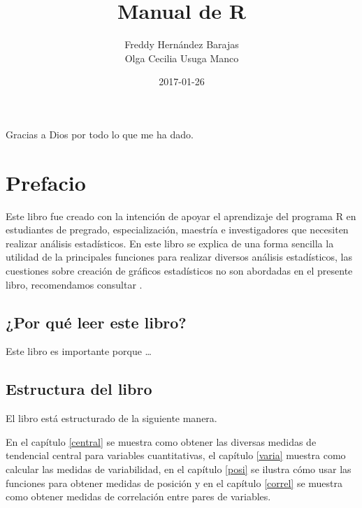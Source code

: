 \documentclass[10pt,]{krantz}
\title{Manual de R}
\author{Freddy Hernández Barajas\\
Olga Cecilia Usuga Manco}
\date{2017-01-26}
\let\proglang=\textsf
\begin{document}
\maketitle


\thispagestyle{empty}

\begin{center}

Gracias a Dios por todo lo que me ha dado.

\end{center}

\setlength{\abovedisplayskip}{-5pt}
\setlength{\abovedisplayshortskip}{-5pt}

{
\hypersetup{linkcolor=black}
\setcounter{tocdepth}{2}
\tableofcontents
}
\listoftables
\listoffigures
\chapter*{Prefacio}\label{prefacio}


Este libro fue creado con la intención de apoyar el aprendizaje del
programa \proglang{R} en estudiantes de pregrado, especialización,
maestría e investigadores que necesiten realizar análisis estadísticos.
En este libro se explica de una forma sencilla la utilidad de la
principales funciones para realizar diversos análisis estadísticos, las
cuestiones sobre creación de gráficos estadísticos no son abordadas en
el presente libro, recomendamos consultar \citet{correa_hernandez}.

\section*{¿Por qué leer este libro?}\label{por-que-leer-este-libro}


Este libro es importante porque \ldots{}

\section*{Estructura del libro}\label{estructura-del-libro}


El libro está estructurado de la siguiente manera.

En el capítulo \ref{central} se muestra como obtener las diversas
medidas de tendencial central para variables cuantitativas, el capítulo
\ref{varia} muestra como calcular las medidas de variabilidad, en el
capítulo \ref{posi} se ilustra cómo usar las funciones para obtener
medidas de posición y en el capítulo \ref{correl} se muestra como
obtener medidas de correlación entre pares de variables.
\end{document}
